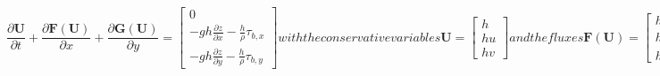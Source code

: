 \documentclass[10pt,a4paper]{article}
\begin{document}
	\begin{subequations}
		\begin{equation}
		\frac{\partial \boldsymbol{U}}{\partial t} + \frac{\partial \boldsymbol{F}(\boldsymbol{U})}{\partial x} + \frac{\partial \boldsymbol{G}(\boldsymbol{U})}{\partial y} = \begin{bmatrix}
		0 \\ -g h \frac{\partial z}{\partial x} - \frac{h}{\rho}\tau_{b,x} \\ -g h \frac{\partial z}{\partial y} - \frac{h}{\rho}\tau_{b,y}
		\end{bmatrix}
		\end{equation}
		with the conservative variables
		\begin{equation}
		\boldsymbol{U} = \begin{bmatrix}
		h \\ hu \\ hv
		\end{bmatrix}
		\end{equation}
		and the fluxes
		\begin{equation}
		\boldsymbol{F}(\boldsymbol{U}) = \begin{bmatrix}
		hu \\ hu^2 + \frac{1}{2}g h^2 \\ h u v
		\end{bmatrix} = \begin{bmatrix}
		U_2 \\ \frac{U_2^2}{U_1} + \frac{1}{2}g U_1^2 \\ \frac{U_2\,U_3}{U_1}
		\end{bmatrix}
		\end{equation}
		and
		\begin{equation}
		\boldsymbol{G}(\boldsymbol{U}) = \begin{bmatrix}
		hu \\ huv \\ hv^2 + \frac{1}{2}g h^2
		\end{bmatrix} = \begin{bmatrix}
		U_3  \\ \frac{U_2\,U_3}{U_1} \\ \frac{U_3^2}{U_1} + \frac{1}{2}g U_1^2
		\end{bmatrix} \,.
		\end{equation}
		\label{eq:shallow_water_equations_conservative_form}
	\end{subequations}
\end{document}
